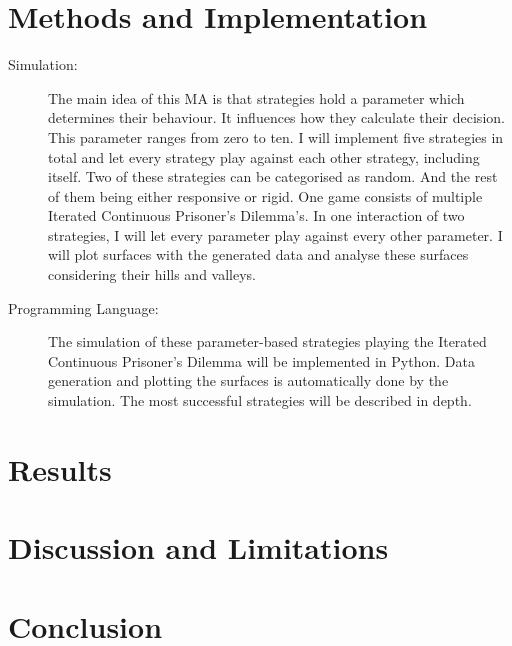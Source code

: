 \documentclass{article}
\begin{document}
\section{Methods and Implementation}

	\begin{description}
		\item[Simulation:]
			The main idea of this MA is that strategies hold a parameter which determines their behaviour. It influences how they calculate their decision. This parameter ranges from zero to ten. I will implement five strategies in total and let every strategy play against each other strategy, including itself. Two of these strategies can be categorised as random. And the rest of them being either responsive or rigid. One game consists of multiple Iterated Continuous Prisoner's Dilemma's. In one interaction of two strategies, I will let every parameter play against every other parameter. I will plot surfaces with the generated data and analyse these surfaces considering their hills and valleys.
		\item[Programming Language:]
	The simulation of these parameter-based strategies playing the Iterated Continuous Prisoner's Dilemma will be implemented in Python. Data generation and plotting the surfaces is automatically done by the simulation. The most successful strategies will be described in depth.
	\end{description}

\section{Results}

\section{Discussion and Limitations}

\section{Conclusion}
\end{document}
